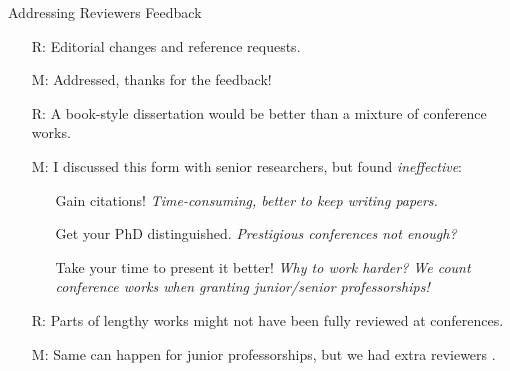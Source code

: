 \documentclass[9pt]{beamer}					%
\begin{document}
\begin{frame}{Addressing Reviewers Feedback}
\begin{itemize}
    \item[R:] Editorial changes and reference requests.
    \item[M:] Addressed, thanks for the feedback!
    \item[R:] A book-style dissertation would be better than a mixture of conference works.
    \item[M:] I discussed this form with senior researchers, but found \emph{ineffective}:
    \begin{itemize}
        \item[\emoji{carrot}] Gain citations! \emph{Time-consuming, better to keep writing papers.}
        \item[\emoji{carrot}] Get your PhD distinguished. \emph{Prestigious conferences not enough?}
        \item[\emoji{sweat-droplets}] Take your time to present it better! \emph{Why to work harder? We count conference works when granting junior/senior  professorships!} 
    \end{itemize}
    \item[R:] Parts of lengthy works might not have been fully reviewed at conferences.
    \item[M:] Same can happen for junior professorships, but we had extra reviewers .
\end{itemize}
\end{frame}
\end{document}
